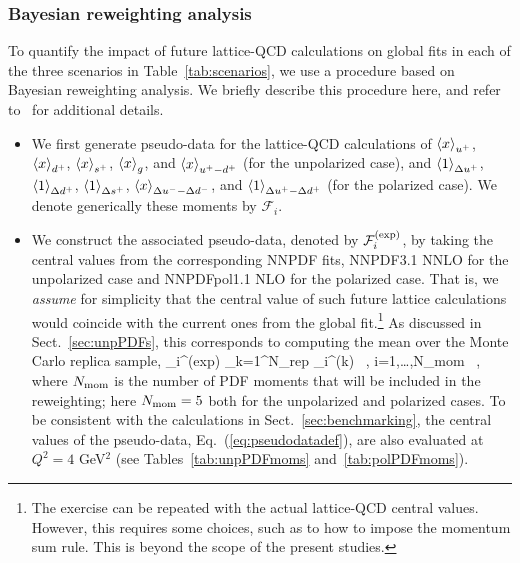 \subsubsection{Bayesian reweighting analysis}
\label{sec:projections:rw}

To quantify the impact of future lattice-QCD calculations on global fits 
in each of the three scenarios in Table~\ref{tab:scenarios},
we use a procedure based on Bayesian reweighting analysis.
%
We briefly describe this procedure here, and refer 
to~\cite{Ball:2011gg,Ball:2010gb} for additional details.

\begin{itemize}

\item We first generate pseudo-data for the lattice-QCD calculations
of $\left\langle x\right\rangle_{u^+}$, $\left\langle x\right\rangle_{d^+}$, $\left\langle x\right\rangle_{s^+}$,
$\left\langle x\right\rangle_{g}$, and $\left\langle x\right\rangle_{u^+-d^+}$ (for the unpolarized case), and
$\left\langle 1\right\rangle_{\Delta u^+}$, $\left\langle 1\right\rangle_{\Delta d^+}$,
$\left\langle 1\right\rangle_{\Delta s^+}$, $\left\langle x\right\rangle_{\Delta u^--\Delta d^-}$, and
$\left\langle 1\right\rangle_{\Delta u^+ - \Delta d^+}$ (for the polarized case).
%
We denote generically these moments by $\mathcal{F}_i$.
  
\item We construct the associated pseudo-data, denoted by 
$\mathcal{F}_i^{\rm (exp)}$, by taking the central values from
the corresponding NNPDF fits, NNPDF3.1 NNLO for the unpolarized case and 
NNPDFpol1.1 NLO for the polarized case.
%
That is, we {\it assume} for simplicity that the central value
of such future lattice calculations would coincide with the current ones
from the global fit.\footnote{ The exercise can be repeated
 with the actual lattice-QCD central values. However, this 
 requires some choices, such as to how to impose 
 the momentum sum rule.
 This is beyond the scope of the present studies.}
%
As discussed in Sect.~\ref{sec:unpPDFs}, this corresponds to computing
the mean over the Monte Carlo replica sample,
\be
\label{eq:pseudodatadef}
_i^{\rm (exp)} \equiv {}\sum_{k=1}^{N_{\rm rep}}
_i^{\rm (k)} \, , \quad i=1,\ldots,N_{\rm mom} \, ,
\ee
where $N_{\rm mom}$ is the number of PDF moments that will be included
in the reweighting; here $N_{\rm mom}=5$ both for the unpolarized and 
polarized cases.
%
To be consistent with the calculations in Sect.~\ref{sec:benchmarking},
the central values of the pseudo-data, Eq.~(\ref{eq:pseudodatadef}),
are also evaluated at $Q^2=4$ GeV$^2$ 
(see Tables~\ref{tab:unpPDFmoms} and~\ref{tab:polPDFmoms}).


\end{itemize}

